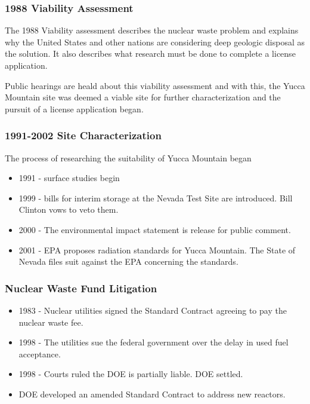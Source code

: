 
\begin{frame}[ctb!]
    \frametitle{1988 Viability Assessment}

    The 1988 Viability assessment describes the nuclear waste problem and 
    explains why the United States and other nations are considering deep 
    geologic disposal as the solution. It also describes what research must be 
    done to complete a license application.

    Public hearings are heald about this viability assessment and with this, the 
    Yucca Mountain site was deemed a viable site for further characterization 
    and the pursuit of a license application began. 

  \end{frame}

\begin{frame}[ctb!]
    \frametitle{1991-2002 Site Characterization}
    The process of researching the suitability of Yucca Mountain began 
    \begin{itemize}
      \item 1991 - surface studies begin 
      \item 1999 - bills for interim storage at the Nevada Test Site are 
        introduced. Bill Clinton vows to veto them.
      \item 2000 - The environmental impact statement is release for public 
        comment.
      \item 2001 - EPA proposes radiation standards for Yucca Mountain. The 
        State of Nevada files suit against the EPA concerning the standards.
    \end{itemize}
  \end{frame}

\begin{frame}[ctb!]
\frametitle{Nuclear Waste Fund Litigation}
    \begin{itemize}
    \item 1983 - Nuclear utilities signed the Standard Contract agreeing to pay the nuclear waste fee.
    \item 1998 - The utilities sue the federal government over the delay in used fuel acceptance.
    \item 1998 - Courts ruled the DOE is partially liable. DOE settled. 
    \item DOE developed an amended Standard Contract \cite{doe_standard_????} to 
      address new reactors.
  \end{itemize}
\end{frame}

